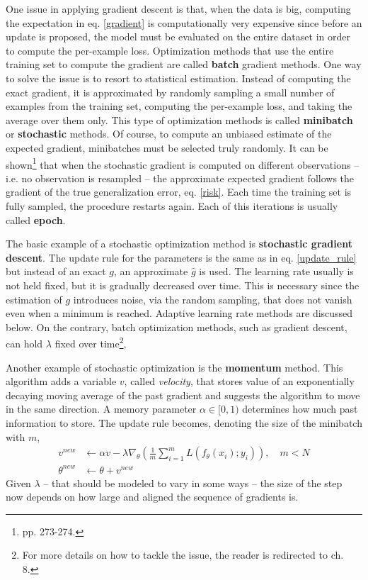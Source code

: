 One issue in applying gradient descent is that, when the data is big, computing the expectation in eq. \eqref{gradient} is computationally very expensive since before an update is proposed, the model must be evaluated on the entire dataset in order to compute the per-example loss. Optimization methods that use the entire training set to compute the gradient are called \textbf{batch} gradient methods. One way to solve the issue is to resort to statistical estimation. Instead of computing the exact gradient, it is approximated by randomly sampling a small number of examples from the training set, computing the per-example loss, and taking the average over them only. This type of optimization methods is called \textbf{minibatch} or \textbf{stochastic} methods. Of course, to compute an unbiased estimate of the expected gradient, minibatches must be selected truly randomly. It can be shown\footnote{\cite{Goodfellow-et-al-2016} pp. 273-274.} that when the stochastic gradient is computed on different observations -- i.e. no observation is resampled -- the approximate expected gradient follows the gradient of the true generalization error, eq. \eqref{risk}. Each time the training set is fully sampled, the procedure restarts again. Each of this iterations is usually called \textbf{epoch}.

The basic example of a stochastic optimization method is \textbf{stochastic gradient descent}. The update rule for the parameters is the same as in eq. \eqref{update_rule} but instead of an exact $g$, an approximate $\hat{g}$ is used. The learning rate usually is not held fixed, but it is gradually decreased over time. This is necessary since the estimation of $g$ introduces noise, via the random sampling, that does not vanish even when a minimum is reached. Adaptive learning rate methods are discussed below. On the contrary, batch optimization methods, such as gradient descent, can hold $\lambda$ fixed over time\footnote{For more details on how to tackle the issue, the reader is redirected to \cite{Goodfellow-et-al-2016} ch. 8.},

Another example of stochastic optimization is the \textbf{momentum} method. This algorithm adds a variable $v$, called \textit{velocity}, that stores value of an exponentially decaying moving average of the past gradient and suggests the algorithm to move in the same direction. A memory parameter $\alpha \in [0,1)$ determines how much past information to store. The update rule becomes, denoting the size of the minibatch with $m$, 
\begin{align*}
    v^{new} & \leftarrow \alpha v - \lambda \nabla_{\theta} \left(\frac{1}{m} \sum_{i=1}^{m} L\left( f_\theta(x_i) ; y_i \right)\right), \quad m < N\\
    \theta^{new} & \leftarrow \theta + v^{new}
\end{align*}
Given $\lambda$ -- that should be modeled to vary in some ways -- the size of the step now depends on how large and aligned the sequence of gradients is.


